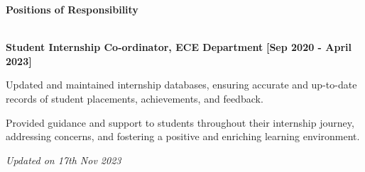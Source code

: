 \documentclass[a4paper,10pt]{article}
\begin{document}
\colorbox{titleColor}{\parbox{6.7in}{\textbf{Positions of Responsibility}}}\\

\textbf{Student Internship Co-ordinator, ECE Department}  \hfill {\small{{\textbf{[Sep 2020 - April 2023]}}}\/}
\begin{itemize*}
  \item Updated and maintained internship databases, ensuring accurate and up-to-date records of student placements, achievements, and feedback.
  \item Provided guidance and support to students throughout their internship journey, addressing concerns, and fostering a positive and enriching learning environment.
\end{itemize*}





\textit{Updated on 17th Nov 2023}
\end{document}
